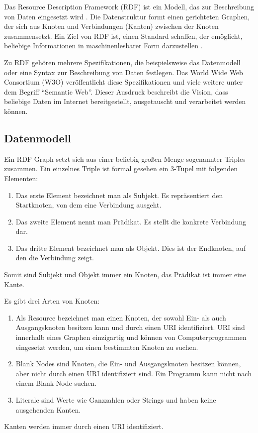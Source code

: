 Das Resource Description Framework (RDF) ist ein Modell, das zur Beschreibung von Daten eingesetzt wird \cite[vgl.][]{w3c2014rdf}. Die Datenstruktur formt einen gerichteten Graphen, der sich aus Knoten und Verbindungen (Kanten) zwischen der Knoten zusammensetzt. Ein Ziel von RDF ist, einen Standard schaffen, der emöglicht, beliebige Informationen in maschinenlesbarer Form darzustellen \cite[vgl.][Sektion 2]{w3c2014rdfprimer}.

Zu RDF gehören mehrere Spezifikationen, die beispielsweise das Datenmodell oder eine Syntax zur Beschreibung von Daten festlegen. Das World Wide Web Consortium (W3O) veröffentlicht diese Spezifikationen und viele weitere unter dem Begriff "`Semantic Web"'. Dieser Ausdruck beschreibt die Vision, dass beliebige Daten im Internet bereitgestellt, ausgetauscht und verarbeitet werden können. \cite[vgl.][]{w3c2014semanticweb}

\subsection{Datenmodell}

Ein RDF-Graph setzt sich aus einer beliebig großen Menge sogenannter Triples zusammen. \cite[vgl.][Sektion 3.1]{w3c2014rdfconcepts} Ein einzelnes Triple ist formal gesehen ein 3-Tupel mit folgenden Elementen:
\begin{enumerate}
	\item Das erste Element bezeichnet man als Subjekt. Es repräsentiert den Startknoten, von dem eine Verbindung ausgeht.
	\item Das zweite Element nennt man Prädikat. Es stellt die konkrete Verbindung dar.
	\item Das dritte Element bezeichnet man als Objekt. Dies ist der Endknoten, auf den die Verbindung zeigt. 
\end{enumerate}

Somit sind Subjekt und Objekt immer ein Knoten, das Prädikat ist immer eine Kante.

Es gibt drei Arten von Knoten:
\begin{enumerate}
	\item Als Resource bezeichnet man einen Knoten, der sowohl Ein- als auch Ausgangsknoten besitzen kann und durch einen URI identifiziert. URI sind innerhalb eines Graphen einzigartig und können von Computerprogrammen eingesetzt werden, um einen bestimmten Knoten zu suchen.
	\item Blank Nodes sind Knoten, die Ein- und Ausgangsknoten besitzen können, aber nicht durch einen URI identifiziert sind. Ein Programm kann nicht nach einem Blank Node suchen.
	\item Literale sind Werte wie Ganzzahlen oder Strings und haben keine ausgehenden Kanten.	
\end{enumerate}
Kanten werden immer durch einen URI identifiziert.

